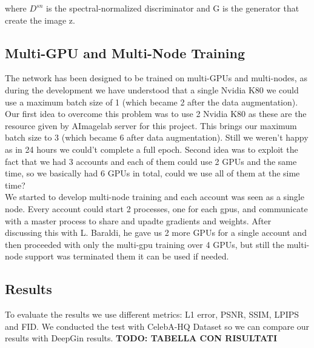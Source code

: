 \documentclass[10pt,twocolumn,letterpaper]{article}
\begin{document}
where \(D^{sn}\) is the spectral-normalized discriminator and G is the generator that create the image z.

\subsection{Multi-GPU and Multi-Node Training}
The network has been designed to be trained on multi-GPUs and multi-nodes, as during the development we have understood that a single Nvidia K80  we could use a maximum batch size of 1 (which became 2 after the data augmentation). Our first idea to overcome this problem was to use 2 Nvidia K80 as these are the resource given by AImagelab server for this project. This brings our maximum batch size to 3 (which became 6 after data augmentation). Still we weren't happy as in 24 hours we could't complete a full epoch. Second idea was to exploit the fact that we had 3 accounts and each of them could use 2 GPUs and the same time, so we basically had 6 GPUs in total, could we use all of them at the sime time?\\
We started to develop multi-node training and each account was seen as a single node.
Every account could start 2 processes, one for each gpus, and communicate with a master process to share and upadte gradients and weights.
After discussing this with L. Baraldi, he gave us 2 more GPUs for a single account and then proceeded with only the multi-gpu training over 4 GPUs, but still the multi-node support was terminated them it can be used if needed.

\subsection{Results}
To evaluate the results we use different metrics: L1 error, PSNR, SSIM, LPIPS and FID. We conducted the test with CelebA-HQ Dataset so we can compare our results with DeepGin results.
\textbf{TODO: TABELLA CON RISULTATI}


{\small


}
\end{document}
